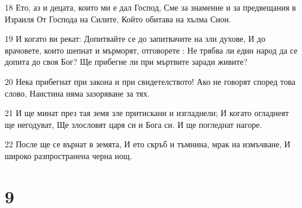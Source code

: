 \par 18 Ето, аз и децата, които ми е дал Господ, Сме за знамение и за предвещания в Израиля От Господа на Силите, Който обитава на хълма Сион.
\par 19 И когато ви рекат: Допитвайте се до запитвачите на зли духове, И до врачовете, които шепнат и мърморят, отговорете : Не трябва ли един народ да се допита до своя Бог? Ще прибегне ли при мъртвите заради живите?
\par 20 Нека прибегнат при закона и при свидетелството! Ако не говорят според това слово, Наистина няма зазоряване за тях.
\par 21 И ще минат през тая земя зле притискани и изгладнели; И когато огладнеят ще негодуват, Ще злословят царя си и Бога си. И ще погледнат нагоре.
\par 22 После ще се върнат в земята, И ето скръб и тъмнина, мрак на измъчване, И широко разпространена черна нощ.

\chapter{9}

